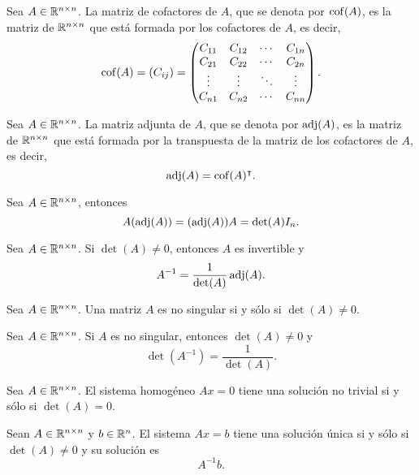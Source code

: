 \documentclass[a4,11pt]{aleph-notas}
\begin{document}
\begin{defi}
    Sea $A \in \Mat[\R]{n}{n}$. La matriz de cofactores de $A$, que se denota por $\cof(A)$, es la matriz de $\Mat[\R]{n}{n}$ que está formada por los cofactores de $A$, es decir, 
    \[
        \cof(A) = (C_{ij}) = 
        \begin{pmatrix}
          C_{11} & C_{12} & \cdots & C_{1n} \\
          C_{21} & C_{22} & \cdots & C_{2n} \\
          \vdots & \vdots & \ddots &\vdots  \\
          C_{n1} & C_{n2} & \cdots & C_{nn}
        \end{pmatrix}.
    \]
\end{defi}


\begin{defi}
    Sea $A \in \Mat[\R]{n}{n}$. La matriz adjunta de $A$, que se denota por $\adj(A)$, es la matriz de $\Mat[\R]{n}{n}$ que está formada por la transpuesta de la matriz de los cofactores de $A$, es decir, 
    \[
        \adj(A) = \cof(A)^\intercal.
    \]
\end{defi}

\begin{teo}
    Sea $A \in \Mat[\R]{n}{n}$, entonces
    \[
        A (\adj(A)) = (\adj(A))A = \det(A)I_n.
    \]
\end{teo}

\begin{cor}
    Sea $A \in \Mat[\R]{n}{n}$. Si $\det(A) \neq 0$, entonces $A$ es invertible y
    \[
        A^{-1} = \dfrac{1}{\det(A)} \adj(A).
    \]
\end{cor}

\begin{teo}
    Sea $A \in \Mat[\R]{n}{n}$. Una matriz $A$ es no singular si y sólo si $\det(A) \neq 0$.
\end{teo}


\begin{teo}
    Sea $A \in \Mat[\R]{n}{n}$. Si $A$ es no singular, entonces $\det(A) \neq 0$ y 
    \[
        \det(A^{-1}) = \dfrac{1}{\det(A)}.
    \]
\end{teo}

\begin{teo}
    Sea $A \in \Mat[\R]{n}{n}$. El sistema homogéneo $Ax = 0$ tiene una solución no trivial si y sólo si $\det(A) = 0$.
\end{teo}

\begin{teo}
    Sean $A \in \Mat[\R]{n}{n}$ y $b\in\R^n$. El sistema $Ax = b$ tiene una solución única si y sólo si $\det(A) \neq 0$ y su solución es
    \[
        A^{-1}b.
    \]
\end{teo}
\end{document}
